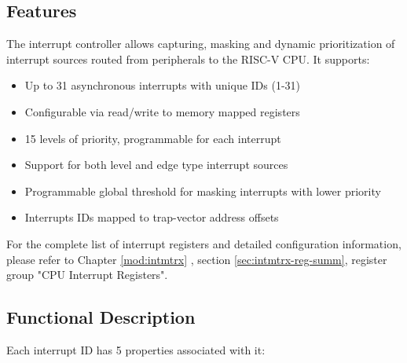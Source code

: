 \documentclass[main\_\_EN.tex]{subfiles}
\begin{document}
\subsection{Features}
\label{sec:riscvcpu-int-features}

The interrupt controller allows capturing, masking and dynamic prioritization of interrupt sources routed from peripherals to the RISC-V CPU. It supports:

\begin{itemize}
    \item Up to 31 asynchronous interrupts with unique IDs (1-31)
    \item Configurable via read/write to memory mapped registers
    \item 15 levels of priority, programmable for each interrupt
    \item Support for both level and edge type interrupt sources
    \item Programmable global threshold for masking interrupts with lower priority
    \item Interrupts IDs mapped to trap-vector address offsets
\end{itemize}

For the complete list of interrupt registers and detailed configuration information, please refer to Chapter \ref{mod:intmtrx} \textit{}, section \ref{sec:intmtrx-reg-summ}, register group "CPU Interrupt Registers".

\subsection{Functional Description}
\label{sec:riscvcpu-int-func-descr}

Each interrupt ID has 5 properties associated with it:
\end{document}
